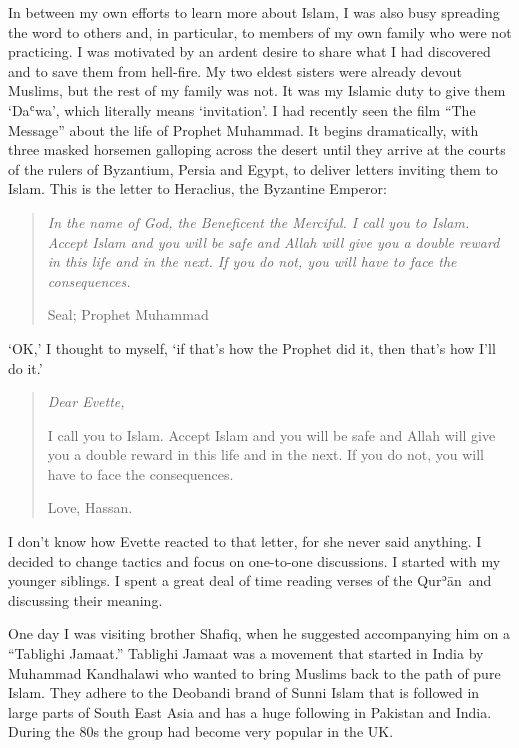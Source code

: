 \documentclass[12pt]{memoir}
\def\´{ʾ} %
\def\`{ʿ} %
\newcommand{\cmt}[2]{#1} %
\def \Quran{Qur\-\´ān} %
\begin{document}
In between my own efforts to learn more about Islam,
I was also busy spreading the word to others and, in particular,
to members of my own family who were not practicing.
I was motivated by an ardent desire to share what I had discovered
and to save them from hell-fire.
My two eldest sisters were already devout Muslims,
but the rest of my family was not.
It was my Islamic duty to give them ‘Da\`wa’,
which literally means ‘invitation’.
I had recently seen the film “The Message” about the life of Prophet Muhammad.
It begins dramatically, with three masked horsemen galloping across the desert
until they arrive at the courts of the rulers of Byzantium,
Persia and Egypt, to deliver letters inviting them to Islam.
This is the letter to Heraclius, the Byzantine Emperor:

\begin{quote}
\itshape
In the name of God, the Beneficent the Merciful.
I call you to Islam.
Accept Islam and you will be safe
and Allah will give you a double reward in this life and in the next.
If you do not, you will have to face the consequences.

Seal; Prophet Muhammad
\end{quote}

‘OK,’ I thought to myself, ‘if that’s how the Prophet did it,
then that’s how I’ll do it.’

\begin{quote}
\itshape
Dear Evette,

I call you to Islam. Accept Islam and you will be safe
and Allah will give you a double reward in this life and in the next.
If you do not, you will have to face the consequences.

Love, Hassan.
\end{quote}

I don’t know how Evette reacted to that letter, for she never said anything.
I decided to change tactics and focus on one-to-one discussions.
I started with my younger siblings.
I spent a great deal of time reading verses of the \Quran\
and discussing their meaning.


One day I was visiting brother Shafiq,
when he suggested accompanying him on a “Tablighi Jamaat.”
Tablighi Jamaat was a movement that \cmt{started}{"was started"}
in India by Muhammad Kandhalawi who wanted to bring Muslims
back to the path of pure Islam.
They adhere to the Deobandi brand of Sunni Islam that is followed
in large parts of South East Asia
and has a huge following in Pakistan and India.
During the 80s the group had become very popular in the UK.
\end{document}
